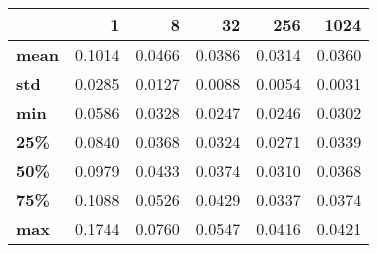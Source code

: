 \begin{tabular}{lrrrrr}
\toprule
{} &       1 &       8 &      32 &     256 &    1024 \\
\midrule
\textbf{mean} &  0.1014 &  0.0466 &  0.0386 &  0.0314 &  0.0360 \\
\textbf{std } &  0.0285 &  0.0127 &  0.0088 &  0.0054 &  0.0031 \\
\textbf{min } &  0.0586 &  0.0328 &  0.0247 &  0.0246 &  0.0302 \\
\textbf{25\% } &  0.0840 &  0.0368 &  0.0324 &  0.0271 &  0.0339 \\
\textbf{50\% } &  0.0979 &  0.0433 &  0.0374 &  0.0310 &  0.0368 \\
\textbf{75\% } &  0.1088 &  0.0526 &  0.0429 &  0.0337 &  0.0374 \\
\textbf{max } &  0.1744 &  0.0760 &  0.0547 &  0.0416 &  0.0421 \\
\bottomrule
\end{tabular}
